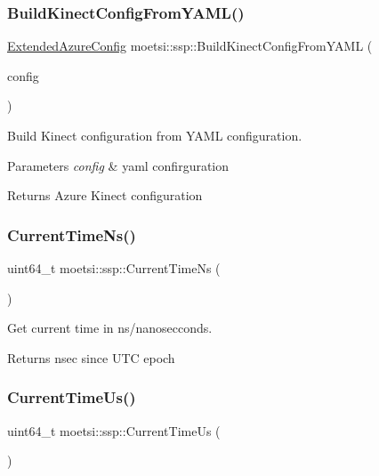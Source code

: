 \subsubsection{\texorpdfstring{Build\+Kinect\+Config\+From\+Y\+A\+M\+L()}{BuildKinectConfigFromYAML()}}
{\footnotesize\ttfamily \hyperlink{structmoetsi_1_1ssp_1_1ExtendedAzureConfig}{Extended\+Azure\+Config} moetsi\+::ssp\+::\+Build\+Kinect\+Config\+From\+Y\+A\+ML (\begin{DoxyParamCaption}\item[{Y\+A\+M\+L\+::\+Node}]{config }\end{DoxyParamCaption})}



Build Kinect configuration from Y\+A\+ML configuration. 


\begin{DoxyParams}{Parameters}
{\em config} & yaml confirguration \\
\hline
\end{DoxyParams}
\begin{DoxyReturn}{Returns}
Azure Kinect configuration 
\end{DoxyReturn}
\mbox{\label{namespacemoetsi_1_1ssp_ae09a8f6b1d89b0bdb6eec602dd581192}} 
\subsubsection{\texorpdfstring{Current\+Time\+Ns()}{CurrentTimeNs()}}
{\footnotesize\ttfamily uint64\+\_\+t moetsi\+::ssp\+::\+Current\+Time\+Ns (\begin{DoxyParamCaption}{ }\end{DoxyParamCaption})}



Get current time in ns/nanosecconds. 

\begin{DoxyReturn}{Returns}
nsec since U\+TC epoch 
\end{DoxyReturn}
\mbox{\label{namespacemoetsi_1_1ssp_ad7107897c233642c927f0129f2aea2e0}} 
\subsubsection{\texorpdfstring{Current\+Time\+Us()}{CurrentTimeUs()}}
{\footnotesize\ttfamily uint64\+\_\+t moetsi\+::ssp\+::\+Current\+Time\+Us (\begin{DoxyParamCaption}{ }\end{DoxyParamCaption})}



